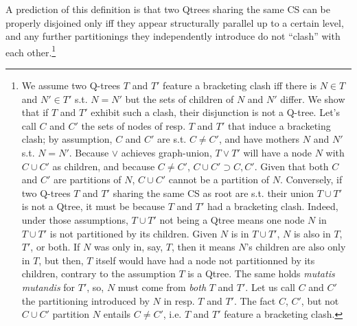 \begin{exe}
	\label{ex2:disj-qtree}
\end{exe}

A prediction of this definition is that two Qtrees sharing the same CS can be properly disjoined only iff they appear structurally parallel up to a certain level, and any further partitionings they independently introduce do not ``clash'' with each other.\footnote{We assume two Q-trees $T$ and $T'$ feature a bracketing clash iff there is $N \in T$ and $N' \in T'$ s.t. $N=N'$ but the sets of children of $N$ and $N'$ differ. We show that if $T$ and $T'$ exhibit such a clash, their disjunction is not a Q-tree. Let's call $C$ and $C'$ the sets of nodes of resp. $T$ and $T'$ that induce a bracketing clash; by assumption, $C$ and $C'$ are s.t. $C\neq C'$, and have mothers $N$ and $N'$ s.t. $N=N'$. Because $\vee$ achieves graph-union, $T\vee T'$ will have a node $N$ with $C\cup C'$ as children, and because $C\neq C'$, $C\cup C' \supset C, C'$. Given that both $C$ and $C'$ are partitions of $N$, $C\cup C'$ cannot be a partition of $N$. Conversely, if two Q-trees $T$ and $T'$ sharing the same CS as root are s.t. their union $T \cup T'$ is not a Qtree, it must be because $T$ and $T'$ had a bracketing clash. Indeed, under those assumptions, $T \cup T'$ not being a Qtree means one node $N$ in $T \cup T'$ is not partitioned by its children. Given $N$ is in $T \cup T'$, $N$ is also in $T$, $T'$, or both. If $N$ was only in, say, $T$, then it means $N$'s children are also only in $T$, but then, $T$ itself would have had a node not partitionned by its children, contrary to the assumption $T$ is a Qtree. The same holds \textit{mutatis mutandis} for $T'$, so, $N$ must come from \textit{both} $T$ and $T'$. Let us call $C$ and $C'$ the partitioning introduced by $N$ in resp. $T$ and $T'$. The fact $C$, $C'$, but not $C \cup C'$ partition $N$ entails $C\neq C'$, i.e. $T$ and $T'$ feature a bracketing clash.}

